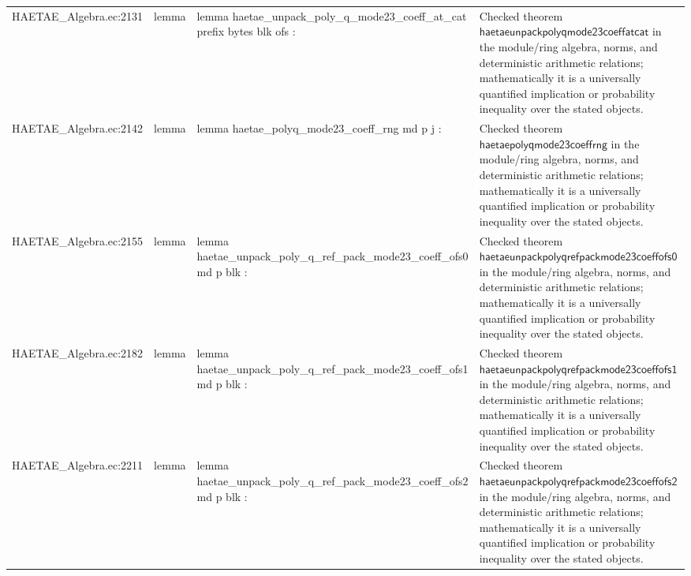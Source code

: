 \documentclass[10pt]{article}
\begin{document}
\begin{longtable}{L{0.11\textwidth}L{0.055\textwidth}L{0.385\textwidth}L{0.41\textwidth}}
HAETAE\_\allowbreak{}Algebra.\allowbreak{}ec:\allowbreak{}2131 & lemma & {\ttfamily\scriptsize lemma haetae\_\allowbreak{}unpack\_\allowbreak{}poly\_\allowbreak{}q\_\allowbreak{}mode23\_\allowbreak{}coeff\_\allowbreak{}at\_\allowbreak{}cat prefix bytes blk ofs :} & Checked theorem $\mathsf{haetaeunpackpolyqmode23coeffatcat}$ in the module/ring algebra, norms, and deterministic arithmetic relations; mathematically it is a universally quantified implication or probability inequality over the stated objects. \\
HAETAE\_\allowbreak{}Algebra.\allowbreak{}ec:\allowbreak{}2142 & lemma & {\ttfamily\scriptsize lemma haetae\_\allowbreak{}polyq\_\allowbreak{}mode23\_\allowbreak{}coeff\_\allowbreak{}rng md p j :} & Checked theorem $\mathsf{haetaepolyqmode23coeffrng}$ in the module/ring algebra, norms, and deterministic arithmetic relations; mathematically it is a universally quantified implication or probability inequality over the stated objects. \\
HAETAE\_\allowbreak{}Algebra.\allowbreak{}ec:\allowbreak{}2155 & lemma & {\ttfamily\scriptsize lemma haetae\_\allowbreak{}unpack\_\allowbreak{}poly\_\allowbreak{}q\_\allowbreak{}ref\_\allowbreak{}pack\_\allowbreak{}mode23\_\allowbreak{}coeff\_\allowbreak{}ofs0 md p blk :} & Checked theorem $\mathsf{haetaeunpackpolyqrefpackmode23coeffofs0}$ in the module/ring algebra, norms, and deterministic arithmetic relations; mathematically it is a universally quantified implication or probability inequality over the stated objects. \\
HAETAE\_\allowbreak{}Algebra.\allowbreak{}ec:\allowbreak{}2182 & lemma & {\ttfamily\scriptsize lemma haetae\_\allowbreak{}unpack\_\allowbreak{}poly\_\allowbreak{}q\_\allowbreak{}ref\_\allowbreak{}pack\_\allowbreak{}mode23\_\allowbreak{}coeff\_\allowbreak{}ofs1 md p blk :} & Checked theorem $\mathsf{haetaeunpackpolyqrefpackmode23coeffofs1}$ in the module/ring algebra, norms, and deterministic arithmetic relations; mathematically it is a universally quantified implication or probability inequality over the stated objects. \\
HAETAE\_\allowbreak{}Algebra.\allowbreak{}ec:\allowbreak{}2211 & lemma & {\ttfamily\scriptsize lemma haetae\_\allowbreak{}unpack\_\allowbreak{}poly\_\allowbreak{}q\_\allowbreak{}ref\_\allowbreak{}pack\_\allowbreak{}mode23\_\allowbreak{}coeff\_\allowbreak{}ofs2 md p blk :} & Checked theorem $\mathsf{haetaeunpackpolyqrefpackmode23coeffofs2}$ in the module/ring algebra, norms, and deterministic arithmetic relations; mathematically it is a universally quantified implication or probability inequality over the stated objects. \\

\end{longtable}
\end{document}
